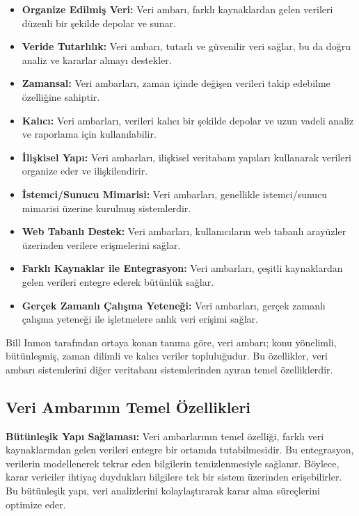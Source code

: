 \documentclass{article}
\begin{document}
\begin{itemize}

    \item \textbf{Organize Edilmiş Veri: } Veri ambarı, farklı kaynaklardan gelen verileri düzenli bir şekilde depolar ve sunar.
    \item \textbf{Veride Tutarlılık: }Veri ambarı, tutarlı ve güvenilir veri sağlar, bu da doğru analiz ve kararlar almayı destekler.
    \item \textbf{Zamansal: }Veri ambarları, zaman içinde değişen verileri takip edebilme özelliğine sahiptir.
    \item \textbf{Kalıcı: }Veri ambarları, verileri kalıcı bir şekilde depolar ve uzun vadeli analiz ve raporlama için kullanılabilir.
    \item \textbf{İlişkisel Yapı: }Veri ambarları, ilişkisel veritabanı yapıları kullanarak verileri organize eder ve ilişkilendirir.
    \item \textbf{İstemci/Sunucu Mimarisi: }Veri ambarları, genellikle istemci/sunucu mimarisi üzerine kurulmuş sistemlerdir.
    \item \textbf{Web Tabanlı Destek: }Veri ambarları, kullanıcıların web tabanlı arayüzler üzerinden verilere erişmelerini sağlar.
    \item \textbf{Farklı Kaynaklar ile Entegrasyon: }Veri ambarları, çeşitli kaynaklardan gelen verileri entegre ederek bütünlük sağlar.
    \item \textbf{Gerçek Zamanlı Çalışma Yeteneği: }Veri ambarları, gerçek zamanlı çalışma yeteneği ile işletmelere anlık veri erişimi sağlar.
    
\end{itemize}

Bill Inmon  \cite{ref3} tarafından ortaya konan tanıma göre, veri ambarı; konu yönelimli, bütünleşmiş, zaman dilimli ve kalıcı veriler topluluğudur. Bu özellikler, veri ambarı sistemlerini diğer veritabanı sistemlerinden ayıran temel özelliklerdir.

\newpage

\subsection{Veri Ambarının Temel Özellikleri}

\vspace{10pt}
\textbf{Bütünleşik Yapı Sağlaması: }Veri ambarlarının temel özelliği, farklı veri kaynaklarından gelen verileri entegre bir ortamda tutabilmesidir. Bu entegrasyon, verilerin modellenerek tekrar eden bilgilerin temizlenmesiyle sağlanır. Böylece, karar vericiler ihtiyaç duydukları bilgilere tek bir sistem üzerinden erişebilirler. Bu bütünleşik yapı, veri analizlerini kolaylaştırarak karar alma süreçlerini optimize eder.
\end{document}
